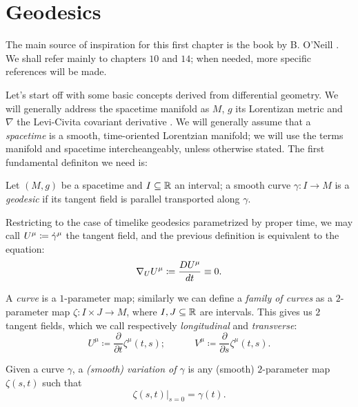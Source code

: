 \section{Geodesics}\label{sec:geodesics}

The main source of inspiration for this first chapter is the book by B. O'Neill \cite{o1983semi}. We shall refer mainly to chapters \(10\) and \(14\); when needed, more specific references will be made.

Let's start off with some basic concepts derived from differential geometry. We will generally address the spacetime manifold as \(M\), \(g\) its Lorentizan metric and \(\nabla\) the Levi-Civita covariant derivative .
We will generally assume that a \emph{spacetime} is a smooth, time-oriented Lorentzian manifold; we will use the terms manifold and spacetime intercheangeably, unless otherwise stated.
The first fundamental definiton we need is:
\begin{definition}
	Let \((M, g)\) be a spacetime and \(I \subseteq {\mathbb{R}}\) an interval; a smooth curve \(\gamma : I \rightarrow M\) is a \emph{geodesic} if its tangent field is parallel transported along \(\gamma\).\\
\end{definition}    


Restricting to the case of timelike geodesics parametrized by proper time, we may call \(U\indices{^{\mu}} \coloneqq \dot{\gamma}^{\mu}\) the tangent field, and the previous definition is equivalent to the equation:
\[
\nabla_U U^{\mu} \coloneqq \frac{D\tensor{U}{^\mu} }{dt} \equiv 0.
\]


A \emph{curve} is a \(1\)-parameter map; similarly we can define a \emph{family of curves} as a \(2\)-parameter map \(\zeta: I \times J \rightarrow M\), where \(I, J \subseteq {\mathbb{R}}\) are intervals. This gives us \(2\) tangent fields, which we call respectively \emph{longitudinal} and \emph{transverse}:
\[
U^{\mu} \coloneqq \frac{\partial}{\partial t} \zeta^{\mu}(t,s); \quad \quad \quad 
V^{\mu} \coloneqq \frac{\partial}{\partial s} \zeta^{\mu}(t,s). 
\]

\begin{definition}
	Given a curve \(\gamma\), a \emph{(smooth) variation of \(\gamma\)} is any (smooth) \(2\)-parameter map \(\zeta(s,t)\) such that 
	\[
	\left. \zeta(s, t) \right\vert_{s = 0} = \gamma(t).
	\]
\end{definition}

